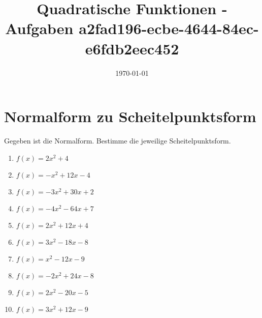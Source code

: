 \documentclass{article}%
\title{Quadratische Funktionen - Aufgaben \newline a2fad196-ecbe-4644-84ec-e6fdb2eec452}%
\date{\today}%
\begin{document}
%
\normalsize%
\maketitle%
\section{Normalform zu Scheitelpunktsform}%
\label{sec:NormalformzuScheitelpunktsform}%
Gegeben ist die Normalform. Bestimme die jeweilige Scheitelpunktsform.%
\begin{enumerate}[label=\alph*)]%
\item%
\newline\vspace{0.5cm} $f(x)=2x^2 + 4$%
\item%
\newline\vspace{0.5cm} $f(x)=-x^2 + 12x - 4$%
\item%
\newline\vspace{0.5cm} $f(x)=-3x^2 + 30x + 2$%
\item%
\newline\vspace{0.5cm} $f(x)=-4x^2 - 64x + 7$%
\item%
\newline\vspace{0.5cm} $f(x)=2x^2 + 12x + 4$%
\item%
\newline\vspace{0.5cm} $f(x)=3x^2 - 18x - 8$%
\item%
\newline\vspace{0.5cm} $f(x)=x^2 - 12x - 9$%
\item%
\newline\vspace{0.5cm} $f(x)=-2x^2 + 24x - 8$%
\item%
\newline\vspace{0.5cm} $f(x)=2x^2 - 20x - 5$%
\item%
\newline\vspace{0.5cm} $f(x)=3x^2 + 12x - 9$%
\end{enumerate}

%
\end{document}
